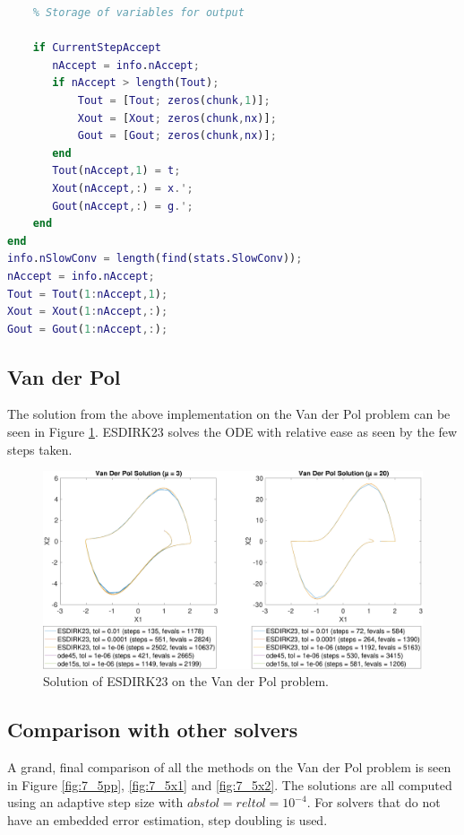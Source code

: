 \begin{adjustwidth*}{0cm}{-0.4cm}
\begin{lstlisting}[frame=single, language=Matlab,caption=ESDIRK23, label=ESDIRK23]
    %=====================================================================
    % Storage of variables for output
    
    if CurrentStepAccept
       nAccept = info.nAccept;
       if nAccept > length(Tout);
           Tout = [Tout; zeros(chunk,1)];
           Xout = [Xout; zeros(chunk,nx)];
           Gout = [Gout; zeros(chunk,nx)];
       end
       Tout(nAccept,1) = t;
       Xout(nAccept,:) = x.';
       Gout(nAccept,:) = g.';
    end
end
info.nSlowConv = length(find(stats.SlowConv));
nAccept = info.nAccept;
Tout = Tout(1:nAccept,1);
Xout = Xout(1:nAccept,:);
Gout = Gout(1:nAccept,:);
\end{lstlisting}
\end{adjustwidth*}

\subsection{Van der Pol}
The solution from the above implementation on the Van der Pol problem can be seen in Figure \ref{fig:7_4}. ESDIRK23 solves the ODE with relative ease as seen by the few steps taken.

\begin{figure}[H]
    \centering
    \includegraphics[width=\textwidth]{plots/7_4b.pdf}
    \caption{Solution of ESDIRK23 on the Van der Pol problem.}
    \label{fig:7_4}
\end{figure}






\subsection{Comparison with other solvers}
A grand, final comparison of all the methods on the Van der Pol problem is seen in Figure \ref{fig:7_5pp}, \ref{fig:7_5x1} and \ref{fig:7_5x2}. The solutions are all computed using an adaptive step size with $abstol = reltol = 10^{-4}$. For solvers that do not have an embedded error estimation, step doubling is used.


